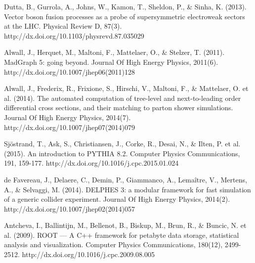 \documentclass[11pt, oneside]{book}
\begin{document}
\begin{thebibliography}{10}
 Dutta, B., Gurrola, A., Johns, W., Kamon, T., Sheldon, P., \& Sinha, K. (2013). Vector boson fusion processes as a probe of supersymmetric electroweak sectors at the LHC. Physical Review D, 87(3). http://dx.doi.org/10.1103/physrevd.87.035029  

 Alwall, J., Herquet, M., Maltoni, F., Mattelaer, O., \& Stelzer, T. (2011).   MadGraph 5: going beyond. Journal Of High Energy Physics, 2011(6). http://dx.doi.org/10.1007/jhep06(2011)128  

 Alwall, J., Frederix, R., Frixione, S., Hirschi, V., Maltoni, F., \& Mattelaer, O. et al. (2014). The automated computation of tree-level and next-to-leading order differential cross sections, and their matching to parton shower simulations. Journal Of High Energy Physics, 2014(7). http://dx.doi.org/10.1007/jhep07(2014)079  

 Sjöstrand, T., Ask, S., Christiansen, J., Corke, R., Desai, N., \& Ilten, P. et al. (2015). An introduction to PYTHIA 8.2. Computer Physics Communications, 191, 159-177. http://dx.doi.org/10.1016/j.cpc.2015.01.024  

 de Favereau, J., Delaere, C., Demin, P., Giammanco, A., Lemaître, V., Mertens, A., \& Selvaggi, M. (2014). DELPHES 3: a modular framework for fast simulation of a generic collider experiment. Journal Of High Energy Physics, 2014(2). http://dx.doi.org/10.1007/jhep02(2014)057  

 Antcheva, I., Ballintijn, M., Bellenot, B., Biskup, M., Brun, R., \& Buncic, N. et al.   (2009). ROOT — A C++ framework for petabyte data storage, statistical analysis and visualization. Computer Physics Communications, 180(12), 2499-2512. http://dx.doi.org/10.1016/j.cpc.2009.08.005   


\end{thebibliography}
\end{document}
